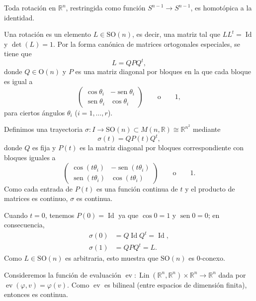 \begin{prop}
Toda rotación en $\mathbb{R}^n$, restringida como función $S^{n-1} \to S^{n-1}$, es homotópica a la identidad.
\end{prop}

\begin{dem}
Una rotación es un elemento $L \in \mathrm{SO}(n)$, es decir, una matriz tal que $L L^t = \operatorname{Id}$ y $\det(L) = 1$. Por la forma canónica de matrices ortogonales especiales, se tiene que
\[
L = Q P Q^t,
\]
donde $Q \in \mathrm{O}(n)$ y $P$ es una matriz diagonal por bloques en la que cada bloque es igual a
\[
\begin{pmatrix}
\cos\theta_i & -\operatorname{sen}\theta_i \\
\operatorname{sen}\theta_i & \cos\theta_i
\end{pmatrix}
\qquad \text{o} \qquad 1,
\]
para ciertos ángulos $\theta_i$ ($i = 1, \dots, r$).

Definimos una trayectoria $\sigma \colon I \to \mathrm{SO}(n) \subset M(n, \mathbb{R}) \cong \mathbb{R}^{n^2}$ mediante
\[
\sigma(t) = Q P(t) Q^t,
\]
donde $Q$ es fija y $P(t)$ es la matriz diagonal por bloques correspondiente con bloques iguales a
\[
\begin{pmatrix}
\cos(t\theta_i) & -\operatorname{sen}(t\theta_i) \\
\operatorname{sen}(t\theta_i) & \cos(t\theta_i)
\end{pmatrix}
\qquad \text{o} \qquad 1.
\]
Como cada entrada de $P(t)$ es una función continua de $t$ y el producto de matrices es continuo, $\sigma$ es continua.

Cuando $t = 0$, tenemos $P(0) = \operatorname{Id}$ ya que $\cos 0 = 1$ y $\operatorname{sen} 0 = 0$; en consecuencia,
\begin{align*}
\sigma(0) &= Q \operatorname{Id} Q^t = \operatorname{Id}, \\
\sigma(1) &= Q P Q^t = L.
\end{align*}
Como $L \in \mathrm{SO}(n)$ es arbitraria, esto muestra que $\mathrm{SO}(n)$ es $0$-conexo.

Consideremos la función de evaluación $\operatorname{ev} \colon \operatorname{Lin}(\mathbb{R}^n, \mathbb{R}^n) \times \mathbb{R}^n \to \mathbb{R}^n$ dada por $\operatorname{ev}(\varphi, v) = \varphi(v)$. Como $\operatorname{ev}$ es bilineal (entre espacios de dimensión finita), entonces es continua.


\end{dem}
